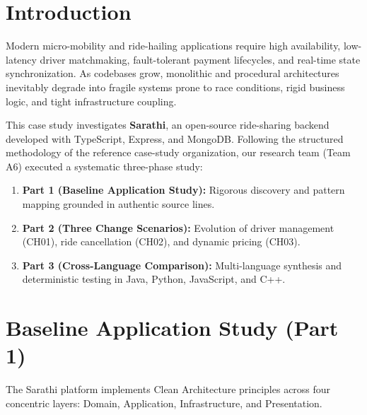 \documentclass[conference]{IEEEtran}
\begin{document}
\section{Introduction}
Modern micro-mobility and ride-hailing applications require high availability, low-latency driver matchmaking, fault-tolerant payment lifecycles, and real-time state synchronization. As codebases grow, monolithic and procedural architectures inevitably degrade into fragile systems prone to race conditions, rigid business logic, and tight infrastructure coupling.

This case study investigates \textbf{Sarathi}, an open-source ride-sharing backend developed with TypeScript, Express, and MongoDB. Following the structured methodology of the reference case-study organization, our research team (Team A6) executed a systematic three-phase study:
\begin{enumerate}
    \item \textbf{Part 1 (Baseline Application Study):} Rigorous discovery and pattern mapping grounded in authentic source lines.
    \item \textbf{Part 2 (Three Change Scenarios):} Evolution of driver management (CH01), ride cancellation (CH02), and dynamic pricing (CH03).
    \item \textbf{Part 3 (Cross-Language Comparison):} Multi-language synthesis and deterministic testing in Java, Python, JavaScript, and C++.
\end{enumerate}

\section{Baseline Application Study (Part 1)}
The Sarathi platform implements Clean Architecture principles across four concentric layers: Domain, Application, Infrastructure, and Presentation.
\end{document}

